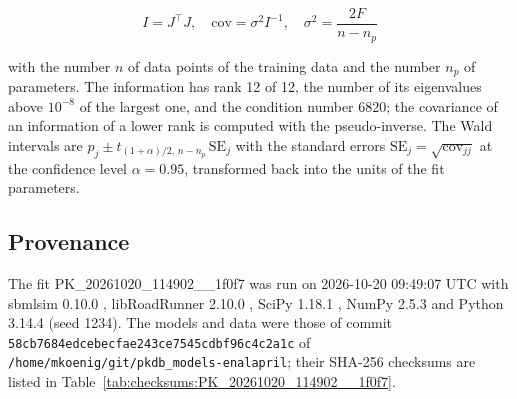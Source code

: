 \begin{equation}
I = J^\top J, \quad \mathrm{cov} = \sigma^2 I^{-1}, \quad \sigma^2 = \frac{2 F}{n - n_p}
\end{equation}

with the number $n$ of data points of the training data and the number $n_p$ of parameters. The information has rank 12 of 12, the number of its eigenvalues above $10^{-8}$ of the largest one, and the condition number 6820; the covariance of an information of a lower rank is computed with the pseudo-inverse. The Wald intervals are $\hat{p}_j \pm t_{(1+\alpha)/2,\, n-n_p}\, \mathrm{SE}_j$ with the standard errors $\mathrm{SE}_j = \sqrt{\mathrm{cov}_{jj}}$ at the confidence level $\alpha = 0.95$, transformed back into the units of the fit parameters.

\subsection{Provenance}

The fit PK\_20261020\_114902\_\_1f0f7 was run on 2026-10-20 09:49:07 UTC with sbmlsim 0.10.0 \cite{Koenig2026_sbmlsim}, libRoadRunner 2.10.0 \cite{Welsh2023}, SciPy 1.18.1 \cite{Virtanen2020}, NumPy 2.5.3 \cite{Harris2020} and Python 3.14.4 (seed 1234). The models and data were those of commit \texttt{58cb7684edcebecfae243ce7545cdbf96c4c2a1c} of \texttt{/home/mkoenig/git/pkdb\_models-enalapril}; their SHA-256 checksums are listed in Table~\ref{tab:checksums:PK_20261020_114902__1f0f7}.

